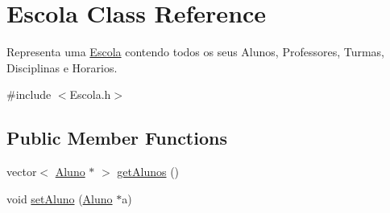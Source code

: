\hypertarget{class_escola}{\section{Escola Class Reference}
\label{class_escola}
}


Representa uma \hyperlink{class_escola}{Escola} contendo todos os seus Alunos, Professores, Turmas, Disciplinas e Horarios.  




{\ttfamily \#include $<$Escola.\-h$>$}

\subsection*{Public Member Functions}
\begin{DoxyCompactItemize}
\item 
vector$<$ \hyperlink{class_aluno}{Aluno} $\ast$ $>$ \hyperlink{class_escola_a881727d5171216be19d3e63cf95e2110}{get\-Alunos} ()
\item 
\hypertarget{class_escola_a56f72e713a433a9b63086df24de6985a}{void \hyperlink{class_escola_a56f72e713a433a9b63086df24de6985a}{set\-Aluno} (\hyperlink{class_aluno}{Aluno} $\ast$a)}\label{class_escola_a56f72e713a433a9b63086df24de6985a}


\end{DoxyCompactItemize}
